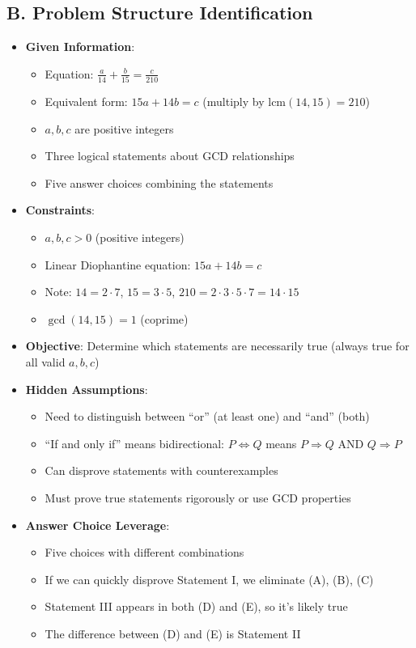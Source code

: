 \documentclass[12pt]{article}
\begin{document}
\begin{problemconfigbox}
\subsection*{B. Problem Structure Identification}
\begin{itemize}[leftmargin=*]
    \item \textbf{Given Information}: 
    \begin{itemize}
        \item Equation: $\frac{a}{14}+\frac{b}{15}=\frac{c}{210}$
        \item Equivalent form: $15a + 14b = c$ (multiply by $\text{lcm}(14,15) = 210$)
        \item $a, b, c$ are positive integers
        \item Three logical statements about GCD relationships
        \item Five answer choices combining the statements
    \end{itemize}
    \item \textbf{Constraints}: 
    \begin{itemize}
        \item $a, b, c > 0$ (positive integers)
        \item Linear Diophantine equation: $15a + 14b = c$
        \item Note: $14 = 2 \cdot 7$, $15 = 3 \cdot 5$, $210 = 2 \cdot 3 \cdot 5 \cdot 7 = 14 \cdot 15$
        \item $\gcd(14, 15) = 1$ (coprime)
    \end{itemize}
    \item \textbf{Objective}: Determine which statements are necessarily true (always true for all valid $a, b, c$)
    \item \textbf{Hidden Assumptions}: 
    \begin{itemize}
        \item Need to distinguish between ``or'' (at least one) and ``and'' (both)
        \item ``If and only if'' means bidirectional: $P \Leftrightarrow Q$ means $P \Rightarrow Q$ AND $Q \Rightarrow P$
        \item Can disprove statements with counterexamples
        \item Must prove true statements rigorously or use GCD properties
    \end{itemize}
    \item \textbf{Answer Choice Leverage}: 
    \begin{itemize}
        \item Five choices with different combinations
        \item If we can quickly disprove Statement I, we eliminate (A), (B), (C)
        \item Statement III appears in both (D) and (E), so it's likely true
        \item The difference between (D) and (E) is Statement II
    \end{itemize}
\end{itemize}


\end{problemconfigbox}
\end{document}
